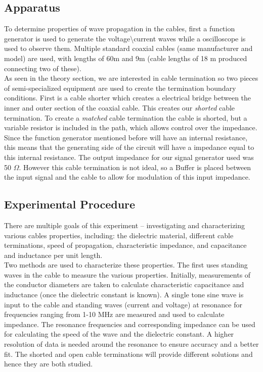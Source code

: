 \subsection{Apparatus}

To determine properties of wave propagation in the cables, first a function generator is used to generate the voltage\textbackslash current waves while a oscilloscope is used to observe them. Multiple standard coaxial cables (same manufacturer and model) are used, with lengths of 60m and 9m (cable lengths of 18 m produced connecting two of these). \\

As seen in the theory section, we are interested in cable termination so two pieces of semi-specialized equipment are used to create the termination boundary conditions. First is a cable shorter which creates a electrical bridge between the inner and outer section of the coaxial cable. This creates our \textit{shorted} cable termination. To create a \textit{matched} cable termination the cable is shorted, but a variable resistor is included in the path, which allows control over the impedance. \\

Since the function generator mentioned before will have an internal resistance, this means that the generating side of the circuit will have a impedance equal to this internal resistance. The output impedance for our signal generator used was 50 $\Omega$. However this cable termination is not ideal, so a Buffer is placed between the input signal and the cable to allow for modulation of this input impedance.\\

\subsection{Experimental Procedure}

There are multiple goals of this experiment -- investigating and characterizing various cables properties, including: the dielectric material, different cable terminations, speed of propagation, characteristic impedance, and capacitance and inductance per unit length. \\

Two methods are used to characterize these properties. The first uses standing waves in the cable to measure the various properties. Initially, measurements of the conductor diameters are taken to calculate characteristic capacitance and inductance (once the dielectric constant is known). A single tone sine wave is input to the cable and standing waves (current and voltage) at resonance for frequencies ranging from 1-10 MHz are measured and used to calculate impedance. The resonance frequencies and corresponding impedance can be used for calculating the speed of the wave and the dielectric constant. A higher resolution of data is needed around the resonance to ensure accuracy and a better fit. The shorted and open cable terminations will provide different solutions and hence they are both studied.\\

